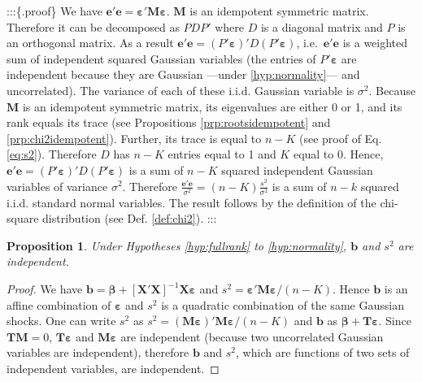 \documentclass[
  12pt,
]{book}
\newtheorem{proposition}{Proposition}[chapter]
\theoremstyle{definition}
\theoremstyle{definition}
\theoremstyle{definition}
\theoremstyle{definition}
\theoremstyle{remark}
\begin{document}
:::\{.proof\} We have \(\mathbf{e}'\mathbf{e}=\boldsymbol\varepsilon'\mathbf{M}\boldsymbol\varepsilon\). \(\mathbf{M}\) is an idempotent symmetric matrix. Therefore it can be decomposed as \(PDP'\) where \(D\) is a diagonal matrix and \(P\) is an orthogonal matrix. As a result \(\mathbf{e}'\mathbf{e} = (P'\boldsymbol\varepsilon)'D(P'\boldsymbol\varepsilon)\), i.e.~\(\mathbf{e}'\mathbf{e}\) is a weighted sum of independent squared Gaussian variables (the entries of \(P'\boldsymbol\varepsilon\) are independent because they are Gaussian ---under \ref{hyp:normality}--- and uncorrelated). The variance of each of these i.i.d. Gaussian variable is \(\sigma^2\). Because \(\mathbf{M}\) is an idempotent symmetric matrix, its eigenvalues are either 0 or 1, and its rank equals its trace (see Propositions \ref{prp:rootsidempotent} and \ref{prp:chi2idempotent}). Further, its trace is equal to \(n-K\) (see proof of Eq. \eqref{eq:s2}). Therefore \(D\) has \(n-K\) entries equal to 1 and \(K\) equal to 0. Hence, \(\mathbf{e}'\mathbf{e} = (P'\boldsymbol\varepsilon)'D(P'\boldsymbol\varepsilon)\) is a sum of \(n-K\) squared independent Gaussian variables of variance \(\sigma^2\). Therefore \(\frac{\mathbf{e}'\mathbf{e}}{\sigma^2} = (n-K)\frac{s^2}{\sigma^2}\) is a sum of \(n-k\) squared i.i.d. standard normal variables. The result follows by the definition of the chi-square distribution (see Def. \ref{def:chi2}).
:::

\begin{proposition}
\protect\hypertarget{prp:indeps2b}{}\label{prp:indeps2b}Under Hypotheses \ref{hyp:fullrank} to \ref{hyp:normality}, \(\mathbf{b}\) and \(s^2\) are independent.
\end{proposition}

\begin{proof}
We have \(\mathbf{b}=\boldsymbol\beta + [\mathbf{X}'{\mathbf{X}}]^{-1}\mathbf{X}\boldsymbol\varepsilon\) and \(s^2 = \boldsymbol\varepsilon' \mathbf{M} \boldsymbol\varepsilon/(n-K)\). Hence \(\mathbf{b}\) is an affine combination of \(\boldsymbol\varepsilon\) and \(s^2\) is a quadratic combination of the same Gaussian shocks. One can write \(s^2\) as \(s^2 = (\mathbf{M}\boldsymbol\varepsilon)' \mathbf{M} \boldsymbol\varepsilon/(n-K)\) and \(\mathbf{b}\) as \(\boldsymbol\beta + \mathbf{T}\boldsymbol\varepsilon\). Since \(\mathbf{T}\mathbf{M}=0\), \(\mathbf{T}\boldsymbol\varepsilon\) and \(\mathbf{M}\boldsymbol\varepsilon\) are independent (because two uncorrelated Gaussian variables are independent), therefore \(\mathbf{b}\) and \(s^2\), which are functions of two sets of independent variables, are independent.
\end{proof}
\end{document}

